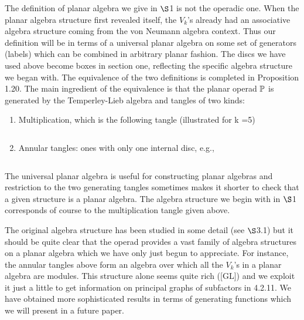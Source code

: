 The definition of planar algebra we give in $\S$1
is not the operadic one. When the planar algebra
structure first revealed itself, the $V_k$'s
already had an associative algebra structure
coming from the von Neumann algebra context. Thus
our definition will be in terms of a universal planar
algebra on some set of generators (labels) which
can be combined in arbitrary planar fashion. The
discs we have used above become boxes in section one, reflecting
the  specific algebra structure we began with. The
equivalence of the two definitions is completed in
Proposition 1.20. The main ingredient of the equivalence is that the
planar operad $\Bbb P$ is generated by the Temperley-Lieb algebra
and tangles of two kinds:
\begin{enumerate}
\item Multiplication, which is the following
tangle (illustrated for k =5)

\[
	
\]

\item Annular tangles: ones with only one internal
disc, e.g.,
\end{enumerate}

\[
	
\]

The universal planar algebra is useful for
constructing planar algebras and restriction to
the two generating tangles sometimes makes it
shorter to check that a given structure is a
planar  algebra.
The algebra structure we begin with in $\S$1 corresponds of
course to the multiplication tangle given above.

The original algebra structure has been studied in
some detail (see $\S$3.1) but it should be quite
clear that the operad provides a vast family of
algebra structures on a planar algebra which we
have only just begun to appreciate. For instance,
the annular tangles above form an algebra over
which all the $V_k$'s in a planar algebra are
modules. This structure alone seems quite rich
([GL]) and we exploit it just a little to get
information on principal graphs of subfactors in
4.2.11. We have obtained more sophisticated
results in terms of generating functions  which we
will present in a future paper.

